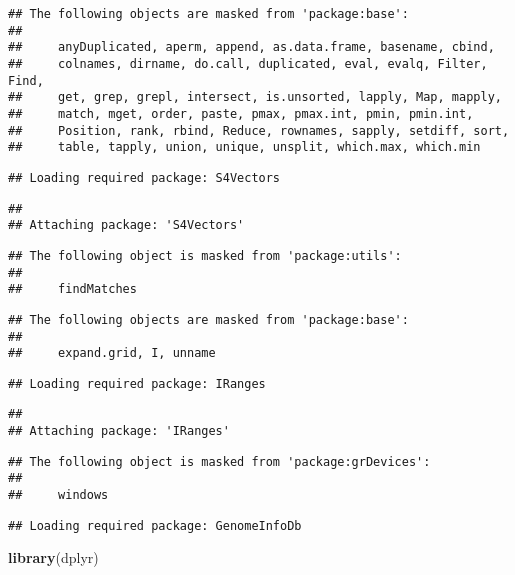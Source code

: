 \documentclass[
]{article}
\newenvironment{Shaded}{\begin{snugshade}}{\end{snugshade}}
\newcommand{\FunctionTok}[1]{\textcolor[rgb]{0.13,0.29,0.53}{\textbf{#1}}}
\newcommand{\NormalTok}[1]{#1}
\begin{document}
\begin{verbatim}
## The following objects are masked from 'package:base':
## 
##     anyDuplicated, aperm, append, as.data.frame, basename, cbind,
##     colnames, dirname, do.call, duplicated, eval, evalq, Filter, Find,
##     get, grep, grepl, intersect, is.unsorted, lapply, Map, mapply,
##     match, mget, order, paste, pmax, pmax.int, pmin, pmin.int,
##     Position, rank, rbind, Reduce, rownames, sapply, setdiff, sort,
##     table, tapply, union, unique, unsplit, which.max, which.min
\end{verbatim}

\begin{verbatim}
## Loading required package: S4Vectors
\end{verbatim}

\begin{verbatim}
## 
## Attaching package: 'S4Vectors'
\end{verbatim}

\begin{verbatim}
## The following object is masked from 'package:utils':
## 
##     findMatches
\end{verbatim}

\begin{verbatim}
## The following objects are masked from 'package:base':
## 
##     expand.grid, I, unname
\end{verbatim}

\begin{verbatim}
## Loading required package: IRanges
\end{verbatim}

\begin{verbatim}
## 
## Attaching package: 'IRanges'
\end{verbatim}

\begin{verbatim}
## The following object is masked from 'package:grDevices':
## 
##     windows
\end{verbatim}

\begin{verbatim}
## Loading required package: GenomeInfoDb
\end{verbatim}

\begin{Shaded}
\begin{Highlighting}[]
\FunctionTok{library}\NormalTok{(dplyr)}
\end{Highlighting}
\end{Shaded}
\end{document}
